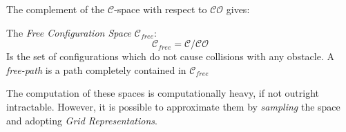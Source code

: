                         The complement of the $\mathcal{C}$-space with respect to $\mathcal{CO}$ gives:
                        \begin{definition}\label{free_configuration_space}
                            The \textit{Free Configuration Space} $\mathcal{C}_{free}$:
                            \begin{equation}\label{free_configuration_eq}
                                \mathcal{C}_{free}=\mathcal{C}/\mathcal{CO}
                            \end{equation}
                            Is the set of configurations which do not cause collisions with any obstacle. A \textit{free-path} is a path completely contained in $\mathcal{C}_{free}$
                        \end{definition}
                        The computation of these spaces is computationally heavy, if not outright intractable. However, it is possible to approximate them by \textit{sampling} the space and adopting \textit{Grid Representations}.
